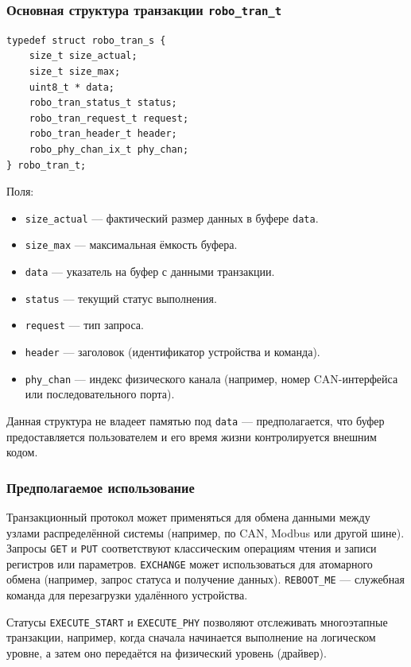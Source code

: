 \documentclass[a4paper,12pt]{article}
\begin{document}
\subsubsection{Основная структура транзакции \texttt{robo\_tran\_t}}

\begin{lstlisting}[caption={Transaction structure}]
typedef struct robo_tran_s {
    size_t size_actual;
    size_t size_max;
    uint8_t * data;
    robo_tran_status_t status;
    robo_tran_request_t request;
    robo_tran_header_t header;
    robo_phy_chan_ix_t phy_chan;
} robo_tran_t;
\end{lstlisting}

Поля:
\begin{itemize}
    \item \texttt{size\_actual} — фактический размер данных в буфере \texttt{data}.
    \item \texttt{size\_max} — максимальная ёмкость буфера.
    \item \texttt{data} — указатель на буфер с данными транзакции.
    \item \texttt{status} — текущий статус выполнения.
    \item \texttt{request} — тип запроса.
    \item \texttt{header} — заголовок (идентификатор устройства и команда).
    \item \texttt{phy\_chan} — индекс физического канала (например, номер CAN-интерфейса или последовательного порта).
\end{itemize}

Данная структура не владеет памятью под \texttt{data} — предполагается, что буфер предоставляется пользователем и его время жизни контролируется внешним кодом.

\subsubsection{Предполагаемое использование}

Транзакционный протокол может применяться для обмена данными между узлами распределённой системы (например, по CAN, Modbus или другой шине). Запросы \texttt{GET} и \texttt{PUT} соответствуют классическим операциям чтения и записи регистров или параметров. \texttt{EXCHANGE} может использоваться для атомарного обмена (например, запрос статуса и получение данных). \texttt{REBOOT\_ME} — служебная команда для перезагрузки удалённого устройства.

Статусы \texttt{EXECUTE\_START} и \texttt{EXECUTE\_PHY} позволяют отслеживать многоэтапные транзакции, например, когда сначала начинается выполнение на логическом уровне, а затем оно передаётся на физический уровень (драйвер).
\end{document}
